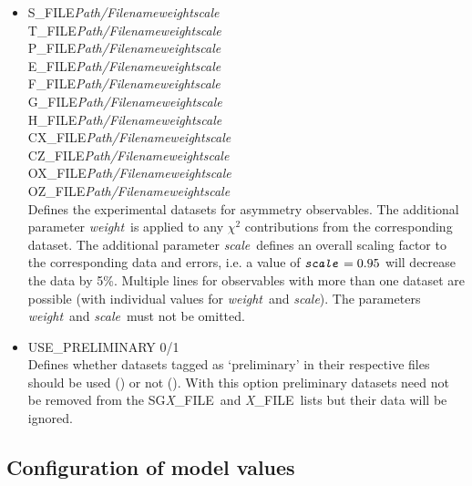 \documentclass[a4paper,10pt]{article}
\def\bl{\phantom{0}}
\def\tt{\ttfamily}
\def\rm{\rmfamily}
\begin{document}
\begin{itemize}
\item
\tt S\_FILE\bl\bl \textit{Path/Filename}\bl \textit{weight}\bl \textit{scale}\rm\\
\tt T\_FILE\bl\bl \textit{Path/Filename}\bl \textit{weight}\bl \textit{scale}\rm\\
\tt P\_FILE\bl\bl \textit{Path/Filename}\bl \textit{weight}\bl \textit{scale}\rm\\
\tt E\_FILE\bl\bl \textit{Path/Filename}\bl \textit{weight}\bl \textit{scale}\rm\\
\tt F\_FILE\bl\bl \textit{Path/Filename}\bl \textit{weight}\bl \textit{scale}\rm\\
\tt G\_FILE\bl\bl \textit{Path/Filename}\bl \textit{weight}\bl \textit{scale}\rm\\
\tt H\_FILE\bl\bl \textit{Path/Filename}\bl \textit{weight}\bl \textit{scale}\rm\\
\tt CX\_FILE\bl   \textit{Path/Filename}\bl \textit{weight}\bl \textit{scale}\rm\\
\tt CZ\_FILE\bl   \textit{Path/Filename}\bl \textit{weight}\bl \textit{scale}\rm\\
\tt OX\_FILE\bl   \textit{Path/Filename}\bl \textit{weight}\bl \textit{scale}\rm\\
\tt OZ\_FILE\bl   \textit{Path/Filename}\bl \textit{weight}\bl \textit{scale}\rm\\
Defines the experimental datasets for asymmetry observables. The additional
parameter \tt\textit{weight}\rm\ is applied to any $\chi^2$ contributions from the corresponding dataset. The additional
parameter \tt\textit{scale}\rm\ defines an overall scaling factor to the corresponding data and errors, i.e.
a value of $\mbox{\tt\textit{scale}\rm} = 0.95$ will decrease the data by 5\%.
Multiple lines for observables with more than one dataset are possible (with individual values for
\tt\textit{weight}\rm\ and \tt\textit{scale}\rm).
The parameters \tt\textit{weight}\rm\ and \tt\textit{scale}\rm\ must not be omitted.

\item
\tt USE\_PRELIMINARY 0/1\rm\\
Defines whether datasets tagged as `preliminary' in their respective files should be used (\tt1\rm) or not (\tt0\rm).
With this option preliminary datasets need not be removed from the 
\tt SG\textit{X}\_FILE\rm\ and \tt \textit{X}\_FILE\rm\ lists but their data will be ignored.
\end{itemize}

\subsection{Configuration of model values}
\end{document}
